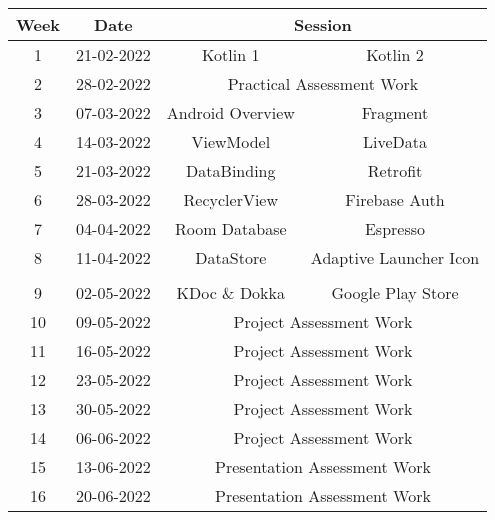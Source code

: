 \documentclass{article}
\begin{document}
\renewcommand{\arraystretch}{1.5}
\begin{tabular}{|c|c|c|c|}
	\hline
	\textbf{Week} & \textbf{Date}     & \multicolumn{2}{c|}{\textbf{Session}}                                             \\ \hline
	\small 1      & \small 21-02-2022 & \small Kotlin 1                                   & \small Kotlin 2               \\ \hline
	\small 2      & \small 28-02-2022 & \multicolumn{2}{c|}{Practical Assessment Work}                                    \\ \hline
	\small 3      & \small 07-03-2022 & \small Android Overview                           & \small Fragment               \\ \hline
	\small 4      & \small 14-03-2022 & \small ViewModel                                  & \small LiveData               \\ \hline
	\small 5      & \small 21-03-2022 & \small DataBinding                                & \small Retrofit               \\ \hline
	\small 6      & \small 28-03-2022 & \small RecyclerView                               & \small Firebase Auth          \\ \hline
	\small 7      & \small 04-04-2022 & \small Room Database                              & \small Espresso               \\ \hline
	\small 8      & \small 11-04-2022 & \small DataStore                                  & \small Adaptive Launcher Icon \\ \hline
	\rowcolor{yellow} \multicolumn{4}{|c|}{\footnotesize Mid Term Break}                                                  \\ \hline
	\small 9      & \small 02-05-2022 & \small KDoc \& Dokka                              & \small Google Play Store      \\ \hline
	\small 10     & \small 09-05-2022 & \multicolumn{2}{c|}{Project Assessment Work}                                      \\ \hline
	\small 11     & \small 16-05-2022 & \multicolumn{2}{c|}{Project Assessment Work}                                      \\ \hline
	\small 12     & \small 23-05-2022 & \multicolumn{2}{c|}{Project Assessment Work}                                      \\ \hline
	\small 13     & \small 30-05-2022 & \multicolumn{2}{c|}{Project Assessment Work}                                      \\ \hline
	\small 14     & \small 06-06-2022 & \multicolumn{2}{c|}{Project Assessment Work}                                      \\ \hline
	\small 15     & \small 13-06-2022 & \multicolumn{2}{c|}{Presentation Assessment Work}                                 \\ \hline
	\small 16     & \small 20-06-2022 & \multicolumn{2}{c|}{Presentation Assessment Work}                                 \\ \hline
\end{tabular}
\end{document}

